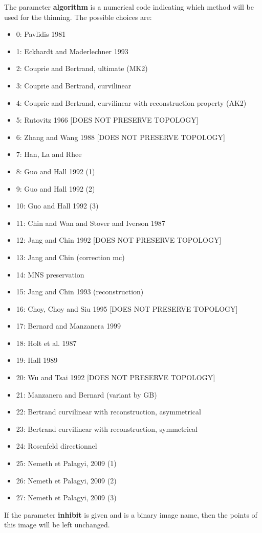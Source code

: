 The parameter {\bf algorithm} is a numerical code indicating which method will be used for the thinning. The possible choices are: \begin{itemize}
\item 0: Pavlidis 1981 \item 1: Eckhardt and Maderlechner 1993 \item 2: Couprie and Bertrand, ultimate (MK2) \item 3: Couprie and Bertrand, curvilinear \item 4: Couprie and Bertrand, curvilinear with reconstruction property (AK2) \item 5: Rutovitz 1966 [DOES NOT PRESERVE TOPOLOGY] \item 6: Zhang and Wang 1988 [DOES NOT PRESERVE TOPOLOGY] \item 7: Han, La and Rhee \item 8: Guo and Hall 1992 (1) \item 9: Guo and Hall 1992 (2) \item 10: Guo and Hall 1992 (3) \item 11: Chin and Wan and Stover and Iverson 1987 \item 12: Jang and Chin 1992 [DOES NOT PRESERVE TOPOLOGY] \item 13: Jang and Chin (correction mc) \item 14: MNS preservation \item 15: Jang and Chin 1993 (reconstruction) \item 16: Choy, Choy and Siu 1995 [DOES NOT PRESERVE TOPOLOGY] \item 17: Bernard and Manzanera 1999 \item 18: Holt et al. 1987 \item 19: Hall 1989 \item 20: Wu and Tsai 1992 [DOES NOT PRESERVE TOPOLOGY] \item 21: Manzanera and Bernard (variant by GB) \item 22: Bertrand curvilinear with reconstruction, asymmetrical \item 23: Bertrand curvilinear with reconstruction, symmetrical \item 24: Rosenfeld directionnel \item 25: Nemeth et Palagyi, 2009 (1) \item 26: Nemeth et Palagyi, 2009 (2) \item 27: Nemeth et Palagyi, 2009 (3)\end{itemize}
If the parameter {\bf inhibit} is given and is a binary image name, then the points of this image will be left unchanged.

